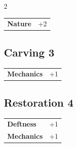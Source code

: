 \begin{multicols}{2}
\begin{tcolorbox}
\begin{tabular}{@{}ll@{}}
    \textbf{Nature} & +2\\
\end{tabular}


\end{tcolorbox}

\begin{tcolorbox}
    \subsection*{Carving \hfill \small{3 }}
    \tcblower




\begin{tabular}{@{}ll@{}}
    \textbf{Mechanics} & +1\\
\end{tabular}


\end{tcolorbox}

\begin{tcolorbox}
    \subsection*{Restoration \hfill \small{4 }}
    \tcblower




\begin{tabular}{@{}ll@{}}
    \textbf{Deftness} & +1\\
    \textbf{Mechanics} & +1\\
\end{tabular}


\end{tcolorbox}


\end{multicols}
